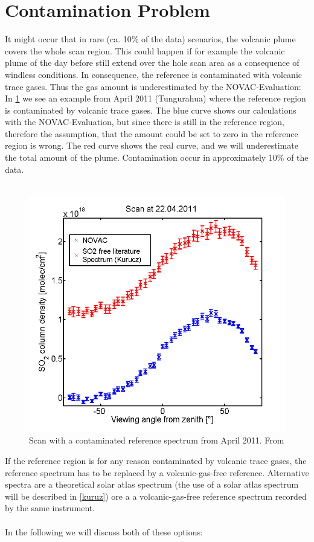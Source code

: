 \documentclass  [
  paper    = a4,
  BCOR     = 10mm,
  twoside,
  fontsize = 12pt,
  fleqn,
  toc      = bibnumbered,
  toc      = listofnumbered,
  numbers  = noendperiod,
  headings = normal,
  listof   = leveldown,
  version  = 3.03
]                                       {scrreprt}
\begin{document}
	\section{Contamination Problem\label{Chap:Cont}}	
	It might occur that in rare (ca. 10\% of the data) scenarios, the
	volcanic plume covers the whole scan region.
	This could happen if for example the volcanic plume of the day before still extend over the hole scan area as a consequence of windless conditions.
	In consequence, the reference	is contaminated with volcanic trace gases. Thus the gas amount is underestimated by the NOVAC-Evaluation: In \cref{fig:contaminated} we see an example from April 2011 (Tungurahua) where the reference region is contaminated by volcanic trace gases. The blue  curve shows our calculations with the NOVAC-Evaluation, but since there is still  in the reference region, therefore the assumption, that the  amount could be set to zero in the reference region is wrong. The red curve shows the real  curve, and we will underestimate the total  amount of the plume. Contamination occur in approximately 10$\%$ of the data.\\
	\\
		\begin{figure}
			\centering
			\includegraphics[width=0.7\linewidth]{Bilder/contaminated}
			\caption{Scan with a contaminated reference spectrum from April 2011. From \cite{WarnachSimon}}
			\label{fig:contaminated}
		\end{figure}
	If the reference region is for any reason
	contaminated by volcanic trace gases, the reference spectrum has to be
	replaced by a volcanic-gas-free reference. Alternative spectra are a
	theoretical solar atlas spectrum (the use of a solar atlas spectrum will be described in \cref{kuruz}) ore a a volcanic-gas-free reference
	spectrum recorded by the same instrument.\\ 
	\\
	In the following we will discuss both of these options:
\end{document}
